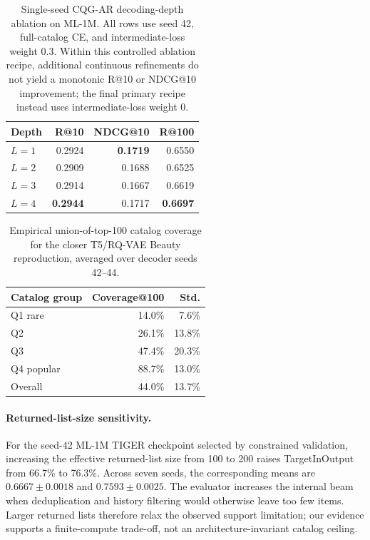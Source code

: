 \documentclass[letterpaper]{article}
\begin{document}
\begin{table}[!t]
\centering
\small
\setlength{\tabcolsep}{6pt}
\renewcommand{\arraystretch}{1.00}
\begin{tabular}{lrrr}
\toprule
Depth & R@10 & NDCG@10 & R@100 \\
\midrule
\(L=1\) & 0.2924 & \textbf{0.1719} & 0.6550 \\
\(L=2\) & 0.2909 & 0.1688 & 0.6525 \\
\(L=3\) & 0.2914 & 0.1667 & 0.6619 \\
\(L=4\) & \textbf{0.2944} & 0.1717 & \textbf{0.6697} \\
\bottomrule
\end{tabular}
\caption{Single-seed CQG-AR decoding-depth ablation on ML-1M. All rows use
seed 42, full-catalog CE, and intermediate-loss weight 0.3. Within this
controlled ablation recipe, additional continuous refinements do not yield a
monotonic R@10 or NDCG@10 improvement; the final primary recipe instead uses
intermediate-loss weight 0.}
\label{tab:ar-depth}
\end{table}


\begin{table}[!htbp]
\centering
\small
\begin{tabular}{lrr}
\toprule
Catalog group & Coverage@100 & Std. \\
\midrule
Q1 rare & 14.0\% & 7.6\% \\
Q2 & 26.1\% & 13.8\% \\
Q3 & 47.4\% & 20.3\% \\
Q4 popular & 88.7\% & 13.0\% \\
\midrule
Overall & 44.0\% & 13.7\% \\
\bottomrule
\end{tabular}
\caption{Empirical union-of-top-100 catalog coverage for the closer T5/RQ-VAE
Beauty reproduction, averaged over decoder seeds 42--44.}
\label{tab:faithful-coverage}
\end{table}

\paragraph{Returned-list-size sensitivity.}
For the seed-42 ML-1M TIGER checkpoint selected by constrained validation,
increasing the effective returned-list size from 100 to 200 raises
TargetInOutput from 66.7\% to 76.3\%. Across seven seeds, the corresponding
means are \(0.6667\pm0.0018\) and \(0.7593\pm0.0025\). The evaluator increases
the internal beam when deduplication and history filtering would otherwise
leave too few items. Larger returned lists therefore relax the observed
support limitation; our evidence supports a finite-compute trade-off, not an
architecture-invariant catalog ceiling.
\end{document}
